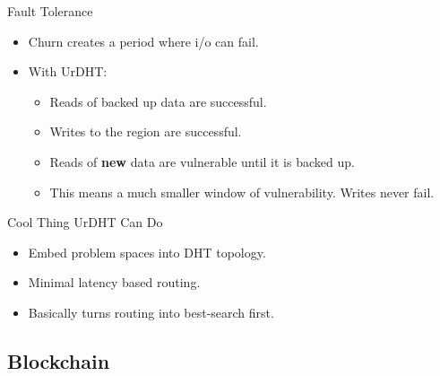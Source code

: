 \documentclass[11pt]{beamer}
\begin{document}
\begin{frame}{Fault Tolerance}
	\begin{itemize}
		\item Churn creates a period where i/o can fail.  
		\item With UrDHT:
		\begin{itemize}
			\item Reads of backed up data are successful.
			\item Writes to the region are successful. 
			\item Reads of \textbf{new} data are vulnerable until it is backed up.
			\item This means a much smaller window of vulnerability.  Writes never fail.%
		\end{itemize}
	\end{itemize}

\end{frame}


\begin{frame}{Cool Thing UrDHT Can Do}
	\begin{itemize}
		\item Embed problem spaces into DHT topology.
		\item Minimal latency based routing.
		\item Basically turns routing into best-search first.
		
	\end{itemize}
\end{frame}



\subsection{Blockchain}
\end{document}
